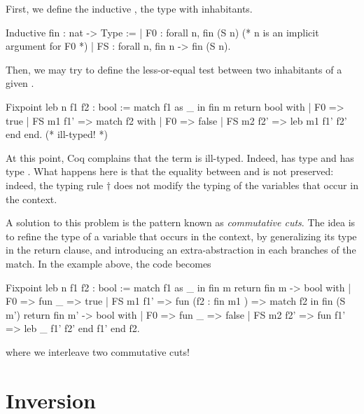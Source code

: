 \documentclass{llncs}
\begin{document}
  First, we define the inductive , the type with
 inhabitants.
\begin{coq}
Inductive fin : nat -> Type :=
| F0 : forall {n}, fin (S n)  (* n is an implicit argument for F0 *)
| FS : forall n, fin n -> fin (S n).
\end{coq}
Then, we may try to define the less-or-equal test between two
inhabitants of a given .
\begin{coq}
Fixpoint leb n f1 f2 : bool :=
match f1 as _ in fin m return bool with 
  | F0 => true  
  | FS m1 f1' => match f2  with | F0 => false | FS m2 f2' => leb m1 f1' f2' end 
end. (* ill-typed! *)
\end{coq}
At this point, Coq complains that the term  is
ill-typed. Indeed,  has type  and 
has type . What happens here is that the equality between
 and  is not preserved: indeed, the typing rule
$\dagger$ does not modify the typing of the variables that occur in
the context.

A solution to this problem is the pattern known as \emph{commutative
  cuts}. The idea is to refine the type of a variable that occurs in
the context, by generalizing its type in the return clause, and
introducing an extra-abstraction in each branches of the match. In the
example above, the code becomes
\begin{coq}
Fixpoint leb n f1 f2 : bool :=
match f1 as _ in  fin m return fin m -> bool with 
| F0 => fun _  => true  
| FS m1 f1' => fun (f2 : fin m1 ) => 
             match f2 in fin (S m') return fin m' -> bool 
             with | F0 => fun _ => false | FS m2 f2' => fun f1' => leb _ f1' f2' end f1'
end f2.
\end{coq}
where we interleave two commutative cuts!  


\section{Inversion}
\end{document}
